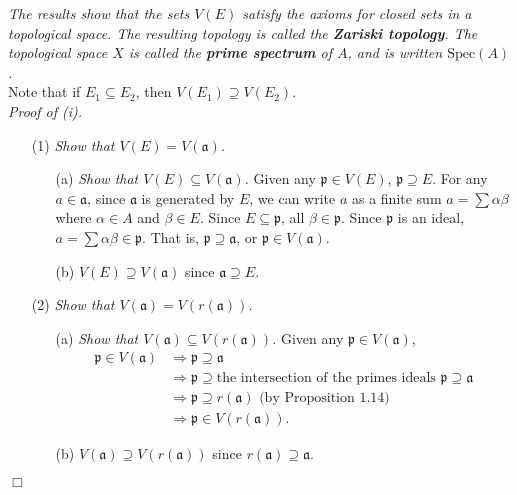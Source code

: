 \documentclass{article}
\begin{document}
\emph{The results show that the sets $V(E)$ satisfy
the axioms for closed sets in a topological space.
The resulting topology is called the \textbf{Zariski topology}.
The topological space $X$ is called the \textbf{prime spectrum} of $A$,
and is written $\mathrm{Spec}(A)$.} \\



Note that if $E_1 \subseteq E_2$,
then $V(E_1) \supseteq V(E_2)$. \\



\emph{Proof of (i).}
\begin{enumerate}
\item[(1)]
  \emph{Show that $V(E) = V(\mathfrak{a})$.}
    \begin{enumerate}
    \item[(a)]
      \emph{Show that $V(E) \subseteq V(\mathfrak{a})$.}
      Given any $\mathfrak{p} \in V(E)$, $\mathfrak{p} \supseteq E$.
      For any $a \in \mathfrak{a}$,
      since $\mathfrak{a}$ is generated by $E$,
      we can write $a$ as a finite sum
      $a = \sum \alpha \beta$ where $\alpha \in A$ and $\beta \in E$.
      Since $E \subseteq \mathfrak{p}$, all $\beta \in \mathfrak{p}$.
      Since $\mathfrak{p}$ is an ideal,
      $a = \sum \alpha \beta \in \mathfrak{p}$.
      That is, $\mathfrak{p} \supseteq \mathfrak{a}$,
      or $\mathfrak{p} \in V(\mathfrak{a})$.

    \item[(b)]
      \emph{$V(E) \supseteq V(\mathfrak{a})$} since $\mathfrak{a} \supseteq E$.
    \end{enumerate}

\item[(2)]
  \emph{Show that $V(\mathfrak{a}) = V(r(\mathfrak{a}))$.}
    \begin{enumerate}
    \item[(a)]
      \emph{Show that $V(\mathfrak{a}) \subseteq V(r(\mathfrak{a}))$.}
      Given any $\mathfrak{p} \in V(\mathfrak{a})$,
      \begin{align*}
        \mathfrak{p} \in V(\mathfrak{a})
        &\Longrightarrow \mathfrak{p} \supseteq \mathfrak{a} \\
        &\Longrightarrow \mathfrak{p} \supseteq \text{the intersection of the primes ideals }
        \mathfrak{p} \supseteq \mathfrak{a} \\
        &\Longrightarrow \mathfrak{p} \supseteq r(\mathfrak{a}) \text{ (by Proposition 1.14)}\\
        &\Longrightarrow \mathfrak{p} \in V(r(\mathfrak{a})).
      \end{align*}

    \item[(b)]
      \emph{$V(\mathfrak{a}) \supseteq V(r(\mathfrak{a}))$}
      since $r(\mathfrak{a}) \supseteq \mathfrak{a}$.
    \end{enumerate}
\end{enumerate}
$\Box$ \\
\end{document}
